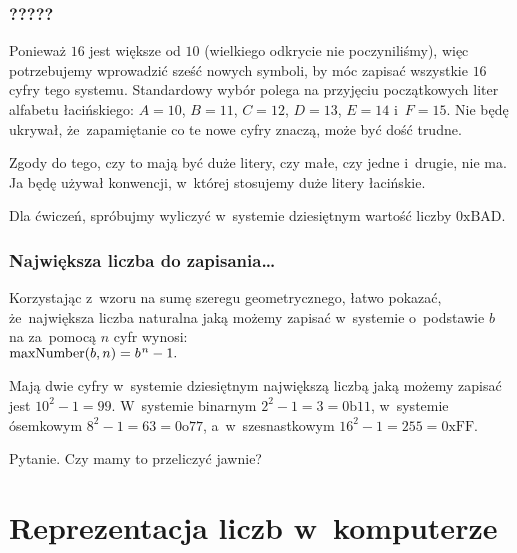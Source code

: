 \documentclass[10pt,t]{beamer}
\begin{document}
\begin{frame}
  \frametitle{?????}


  Ponieważ $16$ jest większe od $10$ (wielkiego odkrycie nie poczyniliśmy),
  więc potrzebujemy wprowadzić sześć nowych symboli, by móc zapisać
  wszystkie $16$ cyfry tego systemu. Standardowy wybór polega na przyjęciu
  początkowych liter alfabetu łacińskiego: $A = 10$, $B = 11$,
  $C = 12$, $D = 13$, $E = 14$ i~$F = 15$. Nie będę ukrywał,
  że~zapamiętanie co te nowe cyfry znaczą, może być dość trudne.

  Zgody do tego, czy to mają być duże litery, czy małe, czy jedne i~drugie,
  nie ma. Ja będę używał konwencji, w~której stosujemy duże litery
  łacińskie.

  Dla ćwiczeń, spróbujmy wyliczyć w~systemie dziesiętnym wartość liczby
  $0\text{xBAD}$.

\end{frame}





\begin{frame}
  \frametitle{Największa liczba do zapisania\ldots}


  Korzystając z~wzoru na sumę szeregu geometrycznego, łatwo pokazać,
  że~największa liczba naturalna jaką możemy zapisać w~systemie o~podstawie
  $b$ na za~pomocą $n$ cyfr wynosi: \\
  $\text{maxNumber}( b, n ) = b^{ \hspace{0.07em} n } - 1.$

  Mają dwie cyfry w~systemie dziesiętnym największą liczbą jaką możemy
  zapisać jest $10^{ 2 } - 1 = 99$. W~systemie binarnym
  $2^{ 2 } - 1 = 3 = 0\text{b}11$, w~systemie ósemkowym $8^{ 2 } - 1 =
  63 = 0\text{o}77$, a~w~szesnastkowym $16^{ 2 } - 1 = 255 = 0\text{xFF}$.

  \alert{Pytanie.} Czy mamy to przeliczyć jawnie?

\end{frame}















\section{Reprezentacja liczb w~komputerze}
\end{document}

